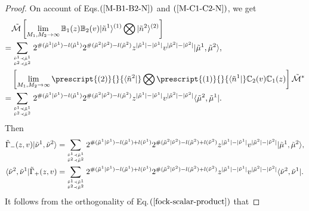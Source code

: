 \documentclass[11pt,reqno]{amsart}
\numberwithin{equation}{section}
\begin{document}
	\begin{proof}
		On account of  Eqs.$(\ref{M-B1-B2-N})$ and $(\ref{M-C1-C2-N})$, we get
		\begin{align}
			&\tilde{\mathcal{M}} \left[ \lim_{M_{1},M_{2} \to \infty} \mathbb{B}_{1}(z) \mathbb{B}_{2}(v)|\tilde{n}^{1}\rangle^{(1)}\bigotimes|\tilde{n}^{2}\rangle^{(2)} \right] \notag\\
			=&\sum_{{\tilde{\nu}^1 \prec \tilde{\mu}^1}	\atop{\tilde{\nu}^2 \prec \tilde{\mu}^2}}
			2^{\#(\tilde{\mu}^{1}|\tilde{\nu}^{1}) - l(\tilde{\mu}^{1})}
			2^{\#(\tilde{\mu}^{2}|\tilde{\nu}^{2}) - l(\tilde{\mu}^{2})}
			z^{|\tilde{\mu}^{1}| - |\tilde{\nu}^{1}|} v^{|\tilde{\mu}^{2}| - |\tilde{\nu}^{2}|}
			| \tilde{\mu}^{1},\tilde{\mu}^{2} \rangle,  \\
			&\left[ \lim_{M_{1},M_{2}  \to \infty}
			\prescript{(2)}{}{\langle \tilde{n}^{2}|}\bigotimes \prescript{(1)}{}{\langle \tilde{n}^{1}|}
			\mathbb{C}_{2}(v)\mathbb{C}_{1}(z) \right] \tilde{\mathcal{M}}^* \notag\\
			=&\sum_{{\tilde{\nu}^1 \prec \tilde{\mu}^1}	\atop{\tilde{\nu}^2 \prec \tilde{\mu}^2}}
			2^{\#(\tilde{\mu}^{1}|\tilde{\nu}^{1}) - l(\tilde{\mu}^{1})}
			2^{\#(\tilde{\mu}^{2}|\tilde{\nu}^{2}) - l(\tilde{\mu}^{2})}
			z^{|\tilde{\mu}^{1}| - |\tilde{\nu}^{1}|} v^{|\tilde{\mu}^{2}| - |\tilde{\nu}^{2}|}
			\langle \tilde{\mu}^{2},\tilde{\mu}^{1} |.
		\end{align}
		Then
		\begin{align}
			\tilde{\Gamma}_-(z,v) |\tilde{\nu}^1,\tilde{\nu}^2 \rangle
			=&\sum_{{\tilde{\nu}^1 \prec \tilde{\mu}^1}	\atop{\tilde{\nu}^2 \prec \tilde{\mu}^2}}
			2^{\#(\tilde{\mu}^{1}|\tilde{\nu}^{1}) - l(\tilde{\mu}^{1})+l(\tilde{\nu}^{1})}
			2^{\#(\tilde{\mu}^{2}|\tilde{\nu}^{2}) - l(\tilde{\mu}^{2})+l(\tilde{\nu}^{2})}
			z^{|\tilde{\mu}^{1}| - |\tilde{\nu}^{1}|} v^{|\tilde{\mu}^{2}| - |\tilde{\nu}^{2}|}
			| \tilde{\mu}^{1},\tilde{\mu}^{2} \rangle,  \label{Gamma--right}  \\
			\langle \tilde{\nu}^2,\tilde{\nu}^1|\tilde{\Gamma}_+(z,v)
			=&\sum_{{\tilde{\nu}^1 \prec \tilde{\mu}^1}	\atop{\tilde{\nu}^2 \prec \tilde{\mu}^2}}
			2^{\#(\tilde{\mu}^{1}|\tilde{\nu}^{1}) - l(\tilde{\mu}^{1})+l(\tilde{\nu}^{1})}
			2^{\#(\tilde{\mu}^{2}|\tilde{\nu}^{2}) - l(\tilde{\mu}^{2})+l(\tilde{\nu}^{2})}
			z^{|\tilde{\mu}^{1}| - |\tilde{\nu}^{1}|} v^{|\tilde{\mu}^{2}| - |\tilde{\nu}^{2}|}
			\langle \tilde{\nu}^2,\tilde{\nu}^1|.\label{Gamma+-left}
		\end{align}
		It follows from the orthogonality of Eq.$(\ref{fock-scalar-product})$ that

\end{proof}
\end{document}
